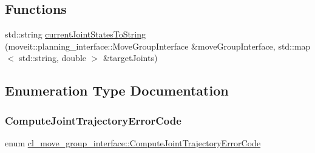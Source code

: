 \subsection*{Functions}
\begin{DoxyCompactItemize}
\item 
std\+::string \hyperlink{namespacecl__move__group__interface_aad71400738b3e25d9fa9ac924670de5d}{current\+Joint\+States\+To\+String} (moveit\+::planning\+\_\+interface\+::\+Move\+Group\+Interface \&move\+Group\+Interface, std\+::map$<$ std\+::string, double $>$ \&target\+Joints)
\end{DoxyCompactItemize}


\subsection{Enumeration Type Documentation}
\mbox{\label{namespacecl__move__group__interface_ae5fc1caf9a16ae5ad1c97c2e137a7017}} 
\subsubsection{\texorpdfstring{Compute\+Joint\+Trajectory\+Error\+Code}{ComputeJointTrajectoryErrorCode}}
{\footnotesize\ttfamily enum \hyperlink{namespacecl__move__group__interface_ae5fc1caf9a16ae5ad1c97c2e137a7017}{cl\+\_\+move\+\_\+group\+\_\+interface\+::\+Compute\+Joint\+Trajectory\+Error\+Code}\hspace{0.3cm}{\ttfamily [strong]}}

